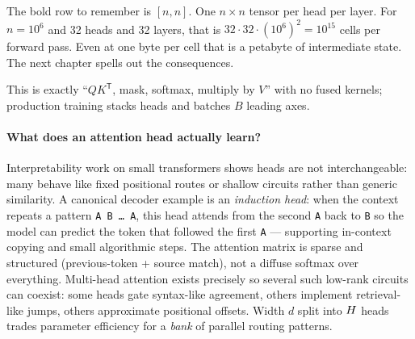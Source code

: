 The bold row to remember is \([n, n]\). One \(n \times n\) tensor per head per
layer. For \(n = 10^6\) and 32 heads and 32 layers, that is
\(32 \cdot 32 \cdot (10^6)^2 = 10^{15}\) cells per forward pass. Even at one
byte per cell that is a petabyte of intermediate state. The next chapter
spells out the consequences.

\noindent
This is exactly ``\(QK^{\mathsf T}\), mask, softmax, multiply by \(V\)'' with
no fused kernels; production training stacks heads and batches \(B\) leading
axes.

\paragraph{What does an attention head actually learn?}
Interpretability work on small transformers shows heads are not interchangeable:
many behave like fixed positional routes or shallow circuits rather than
generic similarity. A canonical decoder example is an
\emph{induction head}: when the context repeats a pattern \texttt{A B \ldots\
A}, this head attends from the second \texttt{A} back to \texttt{B} so the
model can predict the token that followed the first \texttt{A} --- supporting
in-context copying and small algorithmic steps. The attention matrix is
sparse and structured (previous-token + source match), not a diffuse softmax
over everything. Multi-head attention exists precisely so several such
low-rank circuits can coexist: some heads gate syntax-like agreement, others
implement retrieval-like jumps, others approximate positional offsets. Width
\(d\) split into \(H\) heads trades parameter efficiency for a \emph{bank}
of parallel routing patterns.
